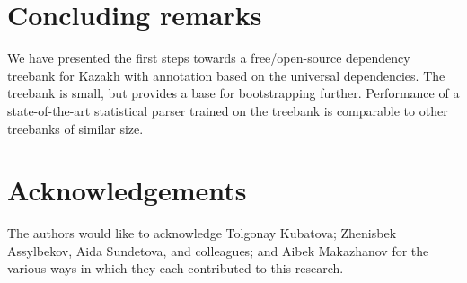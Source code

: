\documentclass[a4paper,11pt, onecolumn,twoside]{article}
\begin{document}
\section{Concluding remarks}\label{sec:conclusions}

We have presented the first steps towards a free/open-source dependency treebank for
Kazakh with annotation based on the universal dependencies. The treebank is small, but
provides a base for bootstrapping further. Performance of a state-of-the-art statistical
parser trained on the treebank is comparable to other treebanks of similar size.

\section*{Acknowledgements}

The authors would like to acknowledge Tolgonay Kubatova; Zhenisbek Assylbekov, Aida Sundetova, and colleagues; and Aibek Makazhanov for the various ways in which they each contributed to this research.


%
%
\begin{small}
\printbibliography
\end{small}
\end{document}
